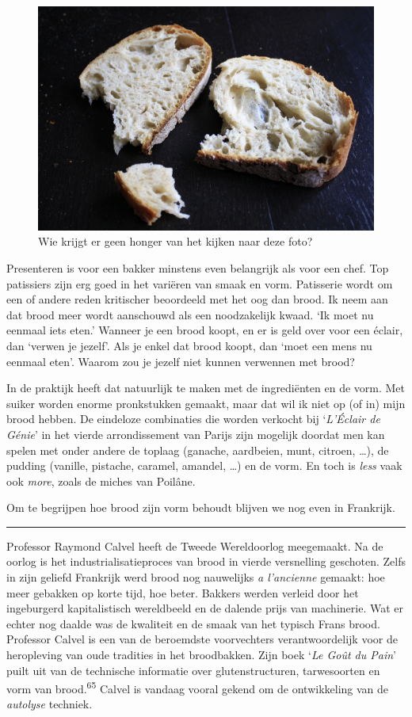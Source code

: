 \documentclass[
  11pt,
  dutch,
]{memoir}
\begin{document}
\begin{figure}
    \centering
    \includegraphics{img/bw/boterham.jpg}
    \caption[Een foto van het kruim van wit tarwebrood.]{Wie krijgt er geen honger van het kijken naar deze foto?}
\end{figure}

Presenteren is voor een bakker minstens even belangrijk als voor een
chef. Top patissiers zijn erg goed in het variëren van smaak en vorm.
Patisserie wordt om een of andere reden kritischer beoordeeld met het
oog dan brood. Ik neem aan dat brood meer wordt aanschouwd als een
noodzakelijk kwaad. `Ik moet nu eenmaal iets eten.' Wanneer je een brood
koopt, en er is geld over voor een éclair, dan `verwen je jezelf'. Als
je enkel dat brood koopt, dan `moet een mens nu eenmaal eten'. Waarom
zou je jezelf niet kunnen verwennen met brood?

In de praktijk heeft dat natuurlijk te maken met de ingrediënten en de
vorm. Met suiker worden enorme pronkstukken gemaakt, maar dat wil ik
niet op (of in) mijn brood hebben. De eindeloze combinaties die worden
verkocht bij `\emph{L'Éclair de Génie}' in het vierde arrondissement van
Parijs zijn mogelijk doordat men kan spelen met onder andere de toplaag
(ganache, aardbeien, munt, citroen, \ldots), de pudding (vanille,
pistache, caramel, amandel, \ldots) en de vorm. En toch is \emph{less}
vaak ook \emph{more}, zoals de miches van Poilâne.

Om te begrijpen hoe brood zijn vorm behoudt blijven we nog even in
Frankrijk.

\pfbreak

Professor Raymond Calvel heeft de Tweede Wereldoorlog meegemaakt. Na de
oorlog is het industrialisatieproces van brood in vierde versnelling
geschoten. Zelfs in zijn geliefd Frankrijk werd brood nog nauwelijks
\emph{a l'ancienne} gemaakt: hoe meer gebakken op korte tijd, hoe beter.
Bakkers werden verleid door het ingeburgerd kapitalistisch wereldbeeld
en de dalende prijs van machinerie. Wat er echter nog daalde was de
kwaliteit en de smaak van het typisch Frans brood. Professor Calvel is
een van de beroemdste voorvechters verantwoordelijk voor de heropleving
van oude tradities in het broodbakken. Zijn boek `\emph{Le Goût du
Pain}' puilt uit van de technische informatie over glutenstructuren,
tarwesoorten en vorm van brood.\textsuperscript{65} Calvel is vandaag
vooral gekend om de ontwikkeling van de \emph{autolyse} techniek.
\end{document}
